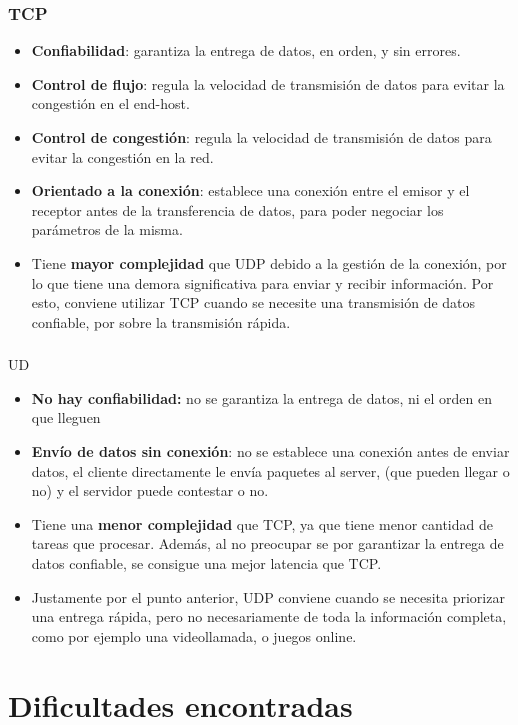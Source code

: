 \documentclass{article}
\begin{document}
\subsubsection{TCP}
\begin{itemize}
\item
  \textbf{Confiabilidad}: garantiza la entrega de datos, en orden, y sin errores.
\item
  \textbf{Control de flujo}: regula la velocidad de transmisión de datos para evitar la congestión en el end-host.
\item
  \textbf{Control de congestión}: regula la velocidad de transmisión de datos para evitar la congestión en la red.
\item
  \textbf{Orientado a la conexión}: establece una conexión entre el emisor y el receptor antes de la transferencia de datos, para poder negociar los parámetros de la misma.
\item
  Tiene \textbf{mayor complejidad} que UDP debido a la gestión de la conexión, por lo que tiene una demora significativa para enviar y recibir información. Por esto, conviene utilizar TCP cuando se necesite una transmisión de datos confiable, por sobre la transmisión rápida.
\end{itemize}

\subsubsection{
}UD
\begin{itemize}
\item
  \textbf{No hay confiabilidad:} no se garantiza la entrega de datos, ni el orden en que lleguen
\item
  \textbf{Envío de datos sin conexión}: no se establece una conexión antes de enviar datos, el cliente directamente le envía paquetes al server, (que pueden llegar o no) y el servidor puede contestar o no.
\item
  Tiene una \textbf{menor complejidad} que TCP, ya que tiene menor cantidad de tareas que procesar. Además, al no preocupar se por garantizar la entrega de datos confiable, se consigue una mejor latencia que TCP.
\item
  Justamente por el punto anterior, UDP conviene cuando se necesita priorizar una entrega rápida, pero no necesariamente de toda la información completa, como por ejemplo una videollamada, o juegos online.
\end{itemize}

\section{\texorpdfstring{\textbf{Dificultades
encontradas}}{Dificultades encontradas}}\label{dificultades-encontradas}
\end{document}
